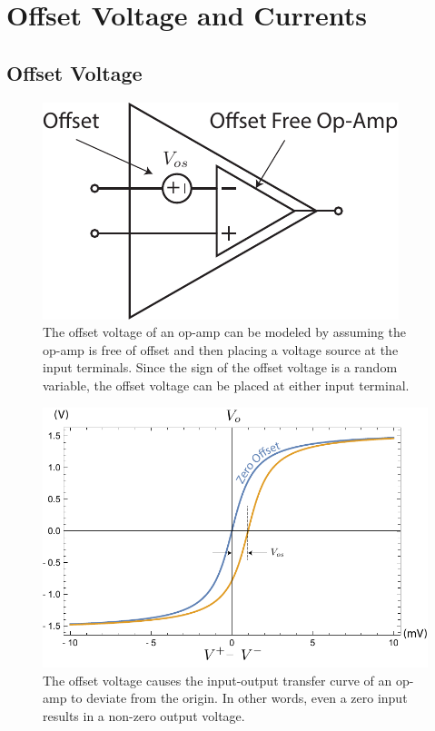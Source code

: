 \section{Offset Voltage and Currents}
\subsection{Offset Voltage}
\begin{figure}[tb]
\centering
\includegraphics[scale=1]{opamp_offset}
\caption{The offset voltage of an op-amp can be modeled by assuming the op-amp is free of offset and then placing a voltage source at the input terminals.  Since the sign of the offset voltage is a random variable, the offset voltage can be placed at either input terminal.}
\label{fig:opamp_offset}
\end{figure}
\begin{figure}[tb]
\centering
\includegraphics[width=.75\columnwidth]{opamp_offset_plot}
\caption{The offset voltage causes the input-output transfer curve of an op-amp to deviate from the origin.  In other words, even a zero input results in a non-zero output voltage.}
\label{fig:opamp_offset_plot}
\end{figure}
